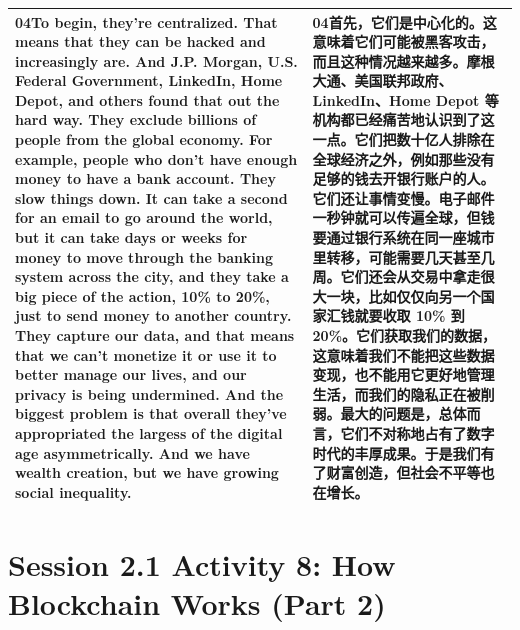 \documentclass[UTF8,zihao=-4,fontset=fandol]{ctexart}
\newcommand{\TranscriptColumn}{\raggedright\arraybackslash\hyphenpenalty=10000\exhyphenpenalty=10000\sloppy}
\begin{document}
\begin{longtable}{>{\TranscriptColumn}p{} >{\TranscriptColumn}p{}}
\textbf{04}\quad To begin, they're centralized. That means that they can be hacked and increasingly are. And J.P. Morgan, U.S. Federal Government, LinkedIn, Home Depot, and others found that out the hard way. They exclude billions of people from the global economy. For example, people who don't have enough money to have a bank account. They slow things down. It can take a second for an email to go around the world, but it can take days or weeks for money to move through the banking system across the city, and they take a big piece of the action, 10\% to 20\%, just to send money to another country. They capture our data, and that means that we can't monetize it or use it to better manage our lives, and our privacy is being undermined. And the biggest problem is that overall they've appropriated the largess of the digital age asymmetrically. And we have wealth creation, but we have growing social inequality. & \textbf{04}\quad 首先，它们是中心化的。这意味着它们可能被黑客攻击，而且这种情况越来越多。摩根大通、美国联邦政府、LinkedIn、Home Depot 等机构都已经痛苦地认识到了这一点。它们把数十亿人排除在全球经济之外，例如那些没有足够的钱去开银行账户的人。它们还让事情变慢。电子邮件一秒钟就可以传遍全球，但钱要通过银行系统在同一座城市里转移，可能需要几天甚至几周。它们还会从交易中拿走很大一块，比如仅仅向另一个国家汇钱就要收取 10\% 到 20\%。它们获取我们的数据，这意味着我们不能把这些数据变现，也不能用它更好地管理生活，而我们的隐私正在被削弱。最大的问题是，总体而言，它们不对称地占有了数字时代的丰厚成果。于是我们有了财富创造，但社会不平等也在增长。 \\ \hline
\end{longtable}


\clearpage
\section{Session 2.1 Activity 8: How Blockchain Works (Part 2)}
\end{document}
